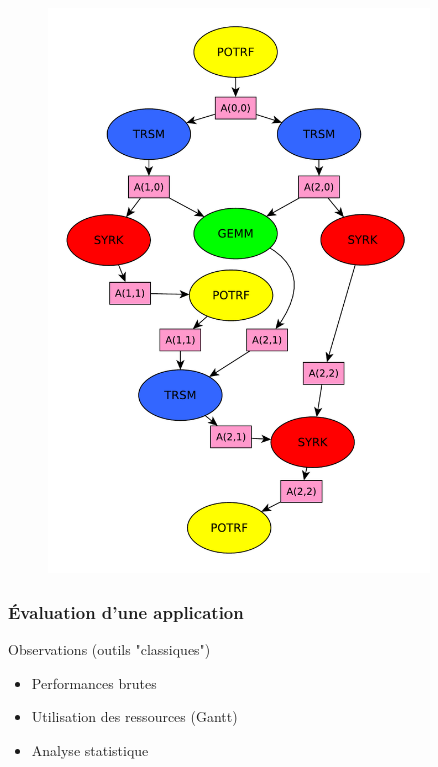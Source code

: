 \documentclass[xcolor={usenames,dvipsnames,svgnames,table}, aspectratio=43]{beamer}
\begin{document}
\begin{frame}[fragile]
\begin{minipage}[t]{0.46\linewidth}
\begin{figure}
{    \includegraphics[width=0.9\textwidth]{graph/cholesky-dag-3-data.pdf}%
  }%
\end{figure}
\end{minipage}


\end{frame}

\begin{frame}
  \frametitle{Évaluation d'une application}

  \begin{block}{Observations (outils "classiques")}
    \begin{itemize}
      \item Performances brutes
      \item Utilisation des ressources (Gantt)
      \item Analyse statistique
    \end{itemize}
  \end{block}
\end{frame}
\end{document}
